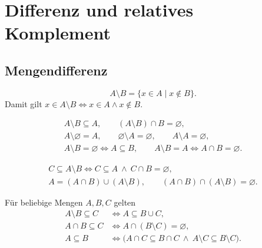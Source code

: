\chapter{Differenz und relatives Komplement}

\section{Mengendifferenz}

\begin{definition}[Differenz]
\[
 A\setminus B=\{x\in A\mid x\notin B\}.
\]
Damit gilt $x\in A\setminus B\Longleftrightarrow
x\in A\land x\notin B$.
\end{definition}

\begin{theorem}
\[
\begin{gathered}
 A\setminus B\subseteq A,\qquad (A\setminus B)\cap B=\varnothing,\\
 A\setminus\varnothing=A,\qquad
 \varnothing\setminus A=\varnothing,\qquad A\setminus A=\varnothing,\\
 A\setminus B=\varnothing\Longleftrightarrow A\subseteq B,\qquad
 A\setminus B=A\Longleftrightarrow A\cap B=\varnothing.
\end{gathered}
\]
\end{theorem}

\begin{theorem}
\[
\begin{gathered}
 C\subseteq A\setminus B
 \Longleftrightarrow C\subseteq A\ \land\ C\cap B=\varnothing,\\
 A=(A\cap B)\cup(A\setminus B),\qquad
 (A\cap B)\cap(A\setminus B)=\varnothing.
\end{gathered}
\]
\end{theorem}

\begin{theorem}
Für beliebige Mengen $A,B,C$ gelten
\[
\begin{aligned}
 A\setminus B\subseteq C
   &\Longleftrightarrow A\subseteq B\cup C,\\
 A\cap B\subseteq C
   &\Longleftrightarrow A\cap(B\setminus C)=\varnothing,\\
 A\subseteq B
   &\Longleftrightarrow
      \bigl(A\cap C\subseteq B\cap C\ \land\
            A\setminus C\subseteq B\setminus C\bigr).
\end{aligned}
\]
\end{theorem}

